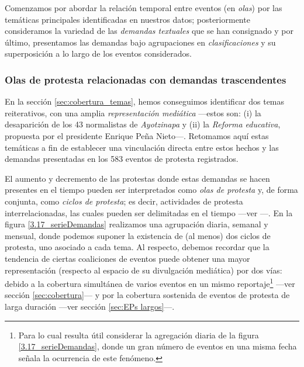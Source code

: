 \documentclass[letterpaper, 11pt]{book}
\theoremstyle{definition}
\theoremstyle{remark}
\begin{document}
Comenzamos por abordar la relación temporal entre eventos (en \emph{olas}) por las temáticas principales identificadas en nuestros datos; 
posteriormente consideramos la variedad de las \emph{demandas textuales} que se han consignado y por último, presentamos las demandas bajo agrupaciones en \emph{clasificaciones} y su superposición a lo largo de los eventos considerados. 




\subsubsection{Olas de protesta relacionadas con demandas trascendentes}
\label{subsubsec:Olas_demandas}

En la sección \ref{sec:cobertura_temas}, hemos conseguimos identificar dos temas reiterativos, con una amplia \emph{representación mediática} ---estos son: 
(i) la desaparición de los 43 normalistas de \emph{Ayotzinapa} y 
(ii) la \emph{Reforma educativa}, propuesta por el presidente Enrique Peña Nieto---.
Retomamos aquí estas temáticas a fin de establecer una vinculación directa entre estos hechos y las demandas presentadas en los 583 eventos de protesta registrados. 


El aumento y decremento de las protestas donde estas demandas se hacen presentes en el tiempo pueden ser interpretados como \emph{olas de protesta} y, de forma conjunta, como \emph{ciclos de protesta}; es decir, actividades de protesta interrelacionadas, las cuales pueden ser delimitadas en el tiempo ---ver ---.
En la figura \ref{3.17_serieDemandas} realizamos una agrupación diaria, semanal y mensual, donde podemos suponer la existencia de (al menos) dos ciclos de protesta, uno asociado a cada tema. 
Al respecto, debemos recordar que la tendencia de ciertas coaliciones de eventos puede obtener una mayor representación (respecto al espacio de su divulgación mediática) por dos vías: debido a la cobertura simultánea de varios eventos en un mismo reportaje\footnote{
    Para lo cual resulta útil considerar la agregación diaria de la figura \ref{3.17_serieDemandas}, donde un gran número de eventos en una misma fecha señala la ocurrencia de este fenómeno.
} 
---ver sección \ref{sec:cobertura}--- y por la cobertura sostenida de eventos de protesta de larga duración ---ver sección \ref{sec:EPs largos}---. 
\end{document}
